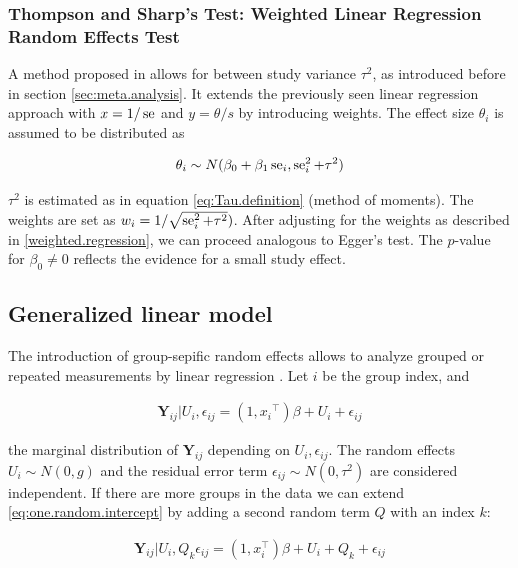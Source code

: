 \documentclass[11pt,a4paper,twoside]{book}\usepackage[]{graphicx}\usepackage[]{color}
\begin{document}
\subsubsection{Thompson and Sharp's Test: Weighted Linear Regression Random Effects Test} \label{sec:Thompson}
A method proposed in \citet{thompson.sharp} allows for between study variance $\tau^2$, as introduced before in section \ref{sec:meta.analysis}. It extends the previously seen linear regression approach with $x = 1/\operatorname{se}$ and $y = \theta/s$ by introducing weights. The effect size $\theta_i$ is assumed to be distributed as

\begin{align}
\theta_i \sim N(\beta_0 + \beta_1 \operatorname{se}_i, \operatorname{se}_i^2 + \tau^2) \label{t.sharp.regression}
\end{align}

$\tau^2$ is estimated as in equation \eqref{eq:Tau.definition} (method of moments). %
The weights are set as $w_i = 1/\sqrt{\operatorname{se}_i^2 + \tau^2})$. After adjusting for the weights as described in \ref{weighted.regression}, we can proceed analogous to Egger's test. The $p$-value for $\beta_{0} \neq 0$ reflects the evidence for a small study effect.

\subsection{Generalized linear model} \label{random.intecepts}
The introduction of group-sepific random effects allows to analyze grouped or repeated measurements by linear regression \citep{Glm}. Let $i$ be the group index, and

\begin{align}
\mathbf{Y}{_{ij}}|U{_i},\epsilon{_{ij}} = (1,x{_i}^\top)\beta + U{_i} + \epsilon{_{ij}} \label{eq:one.random.intercept}
\end{align}

the marginal distribution of $\mathbf{Y}{_{ij}}$ depending on $U{_i},\epsilon{_{ij}}$. The random effects $U{_i} \sim N(0, g)$ and the residual error term $\epsilon{_{ij}} \sim N(0, \tau^{2})$ are considered independent. If there are more groups in the data we can extend \eqref{eq:one.random.intercept} by adding a second random term $Q$ with an index $k$:

\begin{align}
\mathbf{Y}{_{ij}}|U_i, Q_k \epsilon{_{ij}} = (1,x_i^\top)\beta + U_i + Q_k + \epsilon{_{ij}} \label{eq:two.random.intercepts}
\end{align}
\end{document}
